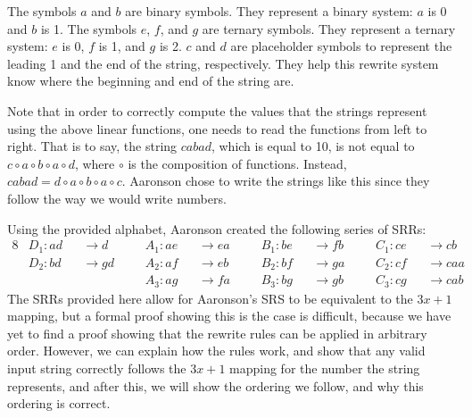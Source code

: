 The symbols $a$ and $b$ are binary symbols. They represent  a binary system: $a$ is 0 and $b$ is 1.  The symbols $e$, $f$, and $g$ are ternary symbols. They represent a ternary system: $e$ is 0, $f$ is 1, and $g$ is 2. $c$ and $d$ are placeholder symbols to represent the leading 1 and the end of the string, respectively. They help this rewrite system know where the beginning and end of the string are. \par
Note that in order to correctly compute the values that the strings represent using the above linear functions, one needs to read the functions from left to right. That is to say, the string $cabad$, which is equal to 10, is not equal to $ c \circ a \circ b \circ a \circ d$, where $\circ$ is the composition of functions. Instead, $cabad = d \circ a \circ b \circ a \circ c$. Aaronson chose to write the strings like this since they follow the way we would write numbers. \par
Using the provided alphabet, Aaronson created the following series of SRRs:
\begin{alignat*}{8}
    &D_1 : ad &&\rightarrow d\ \ && \ \ A_1 : ae &&\rightarrow ea\ \ && \ \ B_1 : be &&\rightarrow fb\ \ && \ \ C_1 : ce &&\rightarrow cb \\
    &D_2 : bd &&\rightarrow gd\ \ && \ \ A_2 : af &&\rightarrow eb\ \ && \ \ B_2 : bf &&\rightarrow ga\ \ && \ \ C_2 : cf &&\rightarrow caa \\
    &\ \ && \ \ && \ \  A_3 : ag &&\rightarrow fa\ \ && \ \  B_3 : bg &&\rightarrow gb\ \ && \ \ C_3 : cg &&\rightarrow cab
\end{alignat*}
The SRRs provided here allow for Aaronson's SRS to be equivalent to the $3x+1$ mapping, but a formal proof showing this is the case is difficult, because we have yet to find a proof showing that the rewrite rules can be applied in arbitrary order. However, we can explain how the rules work, and show that any valid input string correctly follows the $3x+1$ mapping for the number the string represents, and after this, we will show the ordering we follow, and why this ordering is correct. \par

